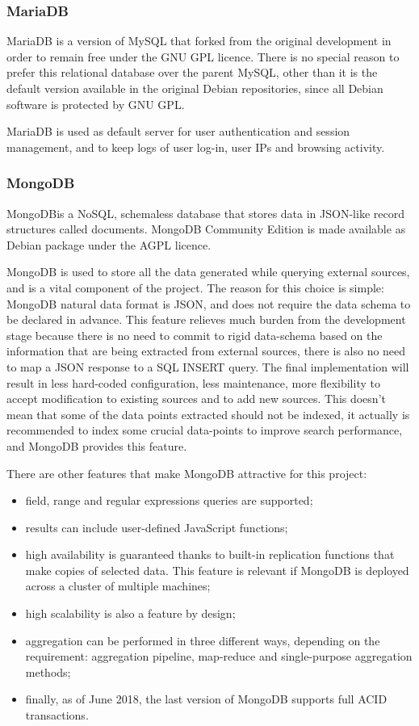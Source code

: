 \subsubsection{MariaDB}
MariaDB is a version of MySQL that forked from the original development in order
to remain free under the GNU GPL licence. There is no special reason to prefer
this relational database over the parent MySQL, other than it is the default
version available in the original Debian repositories, since all Debian software
is protected by GNU GPL.

MariaDB is used as default server for user authentication and session
management, and to keep logs of user log-in, user IPs and browsing activity.


\subsubsection{MongoDB}

MongoDB\texttrademark is a NoSQL, schemaless database that stores data in
JSON-like record structures called documents. MongoDB Community Edition is made
available as Debian package under the AGPL licence.

MongoDB is used to store all the data generated while querying external
sources, and is a vital component of the project. The reason for this choice is
simple: MongoDB natural data format is JSON, and does not require the
data schema to be declared in advance. This feature relieves much burden from
the development stage because there is no need to commit to rigid data-schema
based on the information that are being extracted from external sources, there is
also no need to map a JSON response to a SQL INSERT query. The final
implementation will result in less hard-coded configuration, less maintenance,
more flexibility to accept modification to existing sources and to add new
sources. This doesn't mean that some of the data points extracted should not be
indexed, it actually is recommended to index some crucial data-points to improve
search performance, and MongoDB provides this feature.

There are other features that make MongoDB attractive for this project:
\begin{itemize}
  \item field, range and regular expressions queries are supported;
  \item results can include user-defined JavaScript functions;
  \item high availability is guaranteed thanks to built-in replication functions
  that make copies of selected data. This feature is relevant if MongoDB is
  deployed across a cluster of multiple machines;
  \item high scalability is also a feature by design;
  \item aggregation can be performed in three different ways, depending on the
  requirement: aggregation pipeline, map-reduce and single-purpose aggregation
  methods;
  \item finally, as of June 2018, the last version of MongoDB supports full ACID
  transactions.
\end{itemize}

